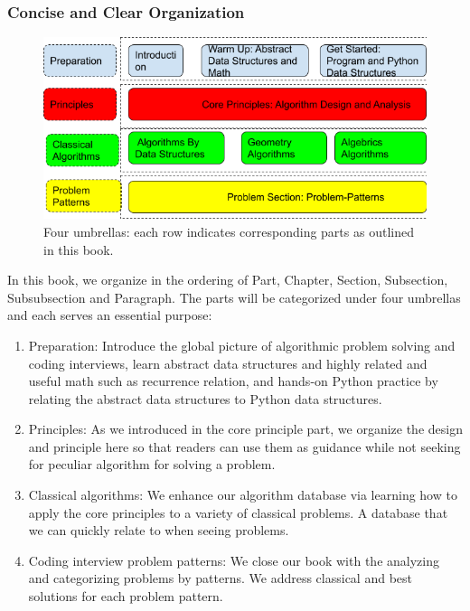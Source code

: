 \documentclass[../main.tex]{subfiles}
\begin{document}
\subsubsection{Concise and Clear Organization}
\begin{figure}[h]
    \centering
    \includegraphics[width=1\columnwidth]{fig/four_umbreallas.png}
    \caption{Four umbrellas:  each row indicates corresponding parts as outlined in this book.}
    \label{fig:four_umbreallas}
\end{figure}

In this book, we organize in the ordering of Part, Chapter, Section, Subsection, Subsubsection and Paragraph. The parts will be categorized under four umbrellas and each serves an essential purpose: 
\begin{enumerate}
    \item Preparation: Introduce the global picture of algorithmic problem solving and coding interviews, learn abstract data structures and highly related and useful math such as recurrence relation, and hands-on Python practice by relating the abstract data structures to Python data structures. 
\item Principles: As we introduced in the core principle part, we organize the design and principle here so that readers can use them as guidance while not seeking for peculiar algorithm for solving a problem. 
\item Classical algorithms: We enhance our algorithm database via learning how to apply the core principles to a variety of classical problems. A database that we can quickly relate to when seeing problems. 
\item Coding interview problem patterns:  We close our book with the analyzing and categorizing problems by patterns. We address classical and best solutions for each problem pattern. 
\end{enumerate}
\end{document}

